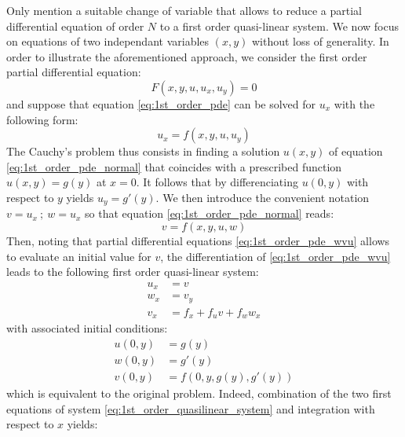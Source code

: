 Only mention a suitable change of variable that allows to reduce a partial differential equation of order $N$ to a first order quasi-linear system. 
We now focus on equations of two independant variables $(x,y)$ without loss of generality. In order to illustrate the aforementioned approach, we consider the first order partial differential equation:
\begin{equation}
  \label{eq:1st_order_pde}
  F(x,y,u,u_x,u_y)=0
\end{equation}
and suppose that equation \ref{eq:1st_order_pde} can be solved for $u_x$ with the following form:
\begin{equation}
  \label{eq:1st_order_pde_normal}
  u_x = f(x,y,u,u_y)
\end{equation}
The Cauchy's problem thus consists in finding a solution $u(x,y)$ of equation \ref{eq:1st_order_pde_normal} that coincides with a prescribed function $u(x,y)=g(y)$ at $x=0$. It follows that by differenciating $u(0,y)$ with respect to $y$ yields $u_y=g'(y)$. We then introduce the convenient notation $v=u_x\: ; \: w = u_x$ so that equation \ref{eq:1st_order_pde_normal} reads:
\begin{equation}
  \label{eq:1st_order_pde_wvu}
  v = f(x,y,u,w)
\end{equation}
Then, noting that partial differential equations \ref{eq:1st_order_pde_wvu} allows to evaluate an initial value for $v$, the differentiation of \ref{eq:1st_order_pde_wvu} leads to the following first order quasi-linear system:
\begin{equation}
  \label{eq:1st_order_quasilinear_system}
  \begin{aligned}
    u_x & = v \\
    w_x & = v_y \\
    v_x &= f_x + f_u v + f_w w_x  
  \end{aligned}
\end{equation}
with associated initial conditions:
\begin{equation}
  \label{eq:1st_order_quasilinear_system_IC}
  \begin{aligned}
    u(0,y) &= g(y)  \\
    w(0,y) &= g'(y) \\
    v(0,y) &= f(0,y,g(y),g'(y))
  \end{aligned}
\end{equation}
which is equivalent to the original problem. Indeed, combination of the two first equations of system \ref{eq:1st_order_quasilinear_system} and integration with respect to $x$ yields:
